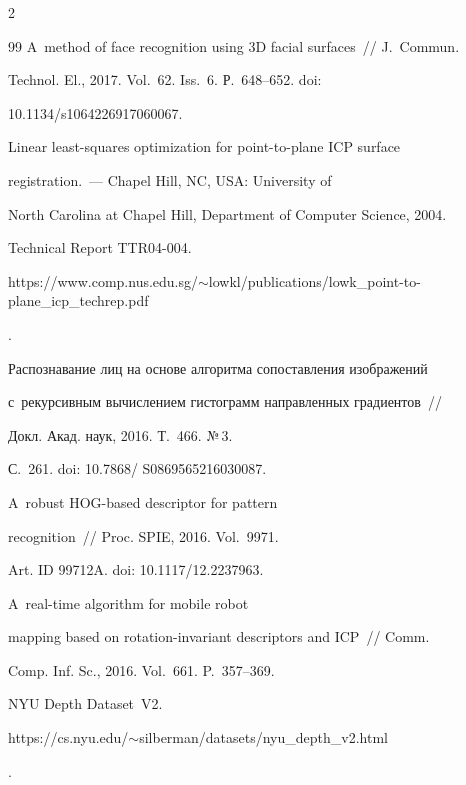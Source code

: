 \begin{multicols}{2}
{{\begin{thebibliography}{99}
A~method of face recognition using 3D facial surfaces~// J.~Commun. 

Technol. El., 2017. Vol.~62. Iss.~6. Р.~648--652. doi: 

10.1134/s1064226917060067.


 Linear least-squares optimization for point-to-plane ICP surface 

registration.~--- Chapel Hill, NC, USA: University of 

North Carolina at Chapel Hill, Department of Computer Science, 2004. 

 Technical Report TTR04-004.

 {\sf 

https://www.comp.nus.edu.sg/$\sim$lowkl/\linebreak publications/lowk\_point-to-plane\_icp\_techrep.pdf}.



Распознавание лиц на основе алгоритма сопоставления изображений 

с~рекурсивным вычислением гистограмм направленных градиентов~// 

Докл.  Акад. наук, 2016. Т.~466. №\,3. 

С.~261. doi: 10.7868/ S0869565216030087.






 A~robust HOG-based descriptor for pattern 

recognition~// Proc. SPIE, 2016. Vol.~9971.

 Art. ID 99712A. doi: 10.1117/12.2237963.


 A~real-time algorithm for mobile robot 

mapping based on rotation-invariant descriptors and ICP~// Comm. 

Comp. Inf. Sc., 2016. Vol.~661. P.~357--369.


 NYU Depth Dataset~V2. {\sf 

https://cs.nyu.edu/$\sim$silberman/datasets/\linebreak  nyu\_depth\_v2.html}.


\end{thebibliography}}}
\end{multicols}

